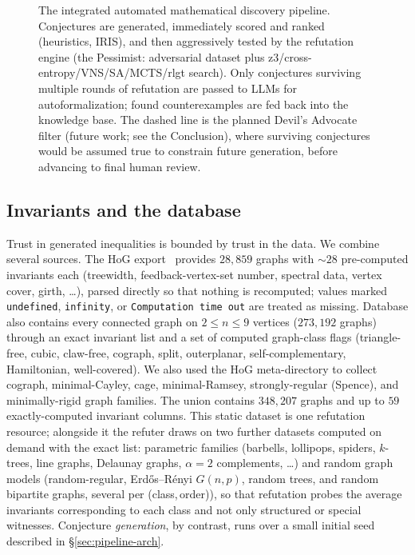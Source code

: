 \documentclass[]{ceurart}
\begin{document}
\begin{figure}[htbp]
{}
    \caption{The integrated automated mathematical discovery pipeline.
    Conjectures are generated, immediately scored and ranked (heuristics, IRIS),
    and then aggressively tested by the refutation engine (the Pessimist:
    adversarial dataset plus z3/cross-entropy/VNS/SA/MCTS/rlgt search). Only conjectures surviving
    multiple rounds of refutation are passed to LLMs for autoformalization; found
    counterexamples are fed back into the knowledge
    base. The dashed line is the planned Devil's Advocate filter (future work; see
    the Conclusion), where surviving
    conjectures would be assumed true to constrain future generation, before advancing
    to final human review.}
    \label{fig:pipeline}
\end{figure}
\subsection{Invariants and the database}
\label{sec:data}

Trust in generated inequalities is bounded by trust in the data. We combine
several sources. The HoG export~\cite{goedgebeur2022introduction,coolsaet2023house} provides $28{,}859$ graphs with $\sim\!28$
pre-computed invariants each (treewidth, feedback-vertex-set number, spectral
data, vertex cover, girth, \dots), parsed directly so that nothing is
recomputed; values marked \texttt{undefined}, \texttt{infinity}, or
\texttt{Computation time out} are treated as missing. Database also contains every connected graph on $2\le n\le 9$ vertices ($273{,}192$ graphs)
through an exact invariant list and a set of computed graph-class flags
(triangle-free, cubic, claw-free, cograph, split, outerplanar,
self-complementary, Hamiltonian, well-covered). We also used the HoG meta-directory to collect cograph, minimal-Cayley, cage,
minimal-Ramsey, strongly-regular (Spence), and minimally-rigid graph families. The
union contains $348{,}207$ graphs and up to $59$ exactly-computed invariant columns. This static
dataset is one refutation resource; alongside it the refuter draws on two further datasets computed
on demand with the exact list: parametric families (barbells, lollipops,
spiders, $k$-trees, line graphs, Delaunay graphs, $\alpha=2$ complements, \dots) and random graph models (random-regular, Erd\H{o}s--R\'enyi $G(n,p)$, random trees,
and random bipartite graphs, several per (class,\,order)), so that refutation probes the average invariants corresponding to each class and not only structured or special witnesses. Conjecture
\emph{generation}, by contrast, runs over a small initial seed described in
\S\ref{sec:pipeline-arch}.
\end{document}
